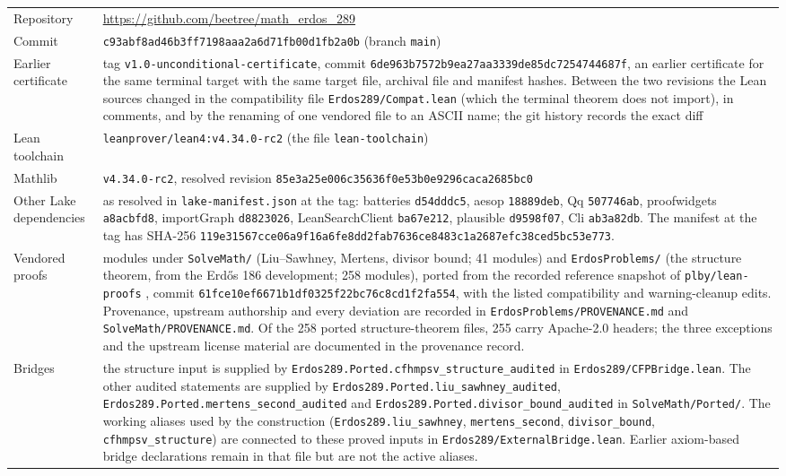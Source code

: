 \documentclass[11pt,letterpaper]{article}
\numberwithin{equation}{section}
\theoremstyle{plain}
\theoremstyle{remark}
\begin{document}
\begin{center}
\footnotesize
\begin{tabular}{@{}>{\raggedright\arraybackslash}p{3.4cm}>{\raggedright\arraybackslash}p{12.4cm}@{}}
\toprule
Repository & \url{https://github.com/beetree/math_erdos_289}\\
Commit & \texttt{c93abf8ad46b3ff7198aaa2a6d71fb00d1fb2a0b} (branch \texttt{main})\\
Earlier certificate & tag \texttt{v1.0-unconditional-certificate}, commit \texttt{6de963b7572b9ea27aa3339de85dc7254744687f}, an earlier certificate for the same terminal target with the same target file, archival file and manifest hashes. Between the two revisions the Lean sources changed in the compatibility file \texttt{Erdos289/Compat.lean} (which the terminal theorem does not import), in comments, and by the renaming of one vendored file to an ASCII name; the git history records the exact diff\\
Lean toolchain & \texttt{leanprover/lean4:v4.34.0-rc2} (the file \texttt{lean-toolchain})\\
Mathlib & \texttt{v4.34.0-rc2}, resolved revision \texttt{85e3a25e006c35636f0e53b0e9296caca2685bc0}\\
Other Lake dependencies & as resolved in \texttt{lake-manifest.json} at the tag: batteries \texttt{d54dddc5}, aesop \texttt{18889deb}, Qq \texttt{507746ab}, proofwidgets \texttt{a8acbfd8}, importGraph \texttt{d8823026}, LeanSearchClient \texttt{ba67e212}, plausible \texttt{d9598f07}, Cli \texttt{ab3a82db}. The manifest at the tag has SHA-256 \texttt{119e31567cce06a9f16a6fe8dd2fab7636ce8483c1a2687efc38ced5bc53e773}.\\
Vendored proofs & modules under \texttt{SolveMath/} (Liu--Sawhney, Mertens, divisor bound; 41 modules) and \texttt{ErdosProblems/} (the structure theorem, from the Erd\H{o}s 186 development; 258 modules), ported from the recorded reference snapshot of \texttt{plby/lean-proofs} \cite{plby}, commit \texttt{61fce10ef6671b1df0325f22bc76c8cd1f2fa554}, with the listed compatibility and warning-cleanup edits. Provenance, upstream authorship and every deviation are recorded in \texttt{ErdosProblems/PROVENANCE.md} and \texttt{SolveMath/PROVENANCE.md}. Of the 258 ported structure-theorem files, 255 carry Apache-2.0 headers; the three exceptions and the upstream license material are documented in the provenance record.\\
Bridges & the structure input is supplied by \texttt{Erdos289.Ported.cfhmpsv\_structure\_audited} in \texttt{Erdos289/CFPBridge.lean}. The other audited statements are supplied by \texttt{Erdos289.Ported.liu\_sawhney\_audited}, \texttt{Erdos289.Ported.mertens\_second\_audited} and \texttt{Erdos289.Ported.divisor\_bound\_audited} in \texttt{SolveMath/Ported/}. The working aliases used by the construction (\texttt{Erdos289.liu\_sawhney}, \texttt{mertens\_second}, \texttt{divisor\_bound}, \texttt{cfhmpsv\_structure}) are connected to these proved inputs in \texttt{Erdos289/ExternalBridge.lean}. Earlier axiom-based bridge declarations remain in that file but are not the active aliases.\\

\end{tabular}
\end{center}
\end{document}

